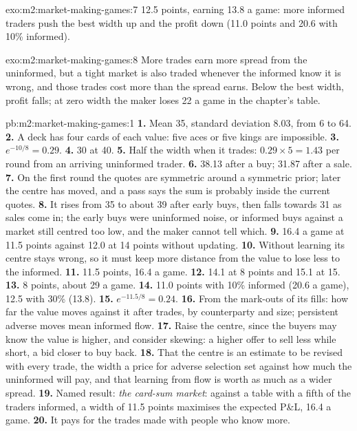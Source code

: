 \begin{solution}{exo:m2:market-making-games:7}
12.5 points, earning 13.8 a game: more informed traders push the best width up and the
profit down (11.0 points and 20.6 with 10\% informed).
\end{solution}

\begin{solution}{exo:m2:market-making-games:8}
More trades earn more spread from the uninformed, but a tight market is also traded
whenever the informed know it is wrong, and those trades cost more than the spread
earns. Below the best width, profit falls; at zero width the maker loses 22 a game in the
chapter's table.
\end{solution}

\begin{solution}{pb:m2:market-making-games:1}
\textbf{1.} Mean 35, standard deviation 8.03, from 6 to 64.
\textbf{2.} A deck has four cards of each value: five aces or five kings are impossible.
\textbf{3.} $e^{-10/8} = 0.29$.
\textbf{4.} 30 at 40.
\textbf{5.} Half the width when it trades: $0.29 \times 5 = 1.43$ per round from an
arriving uninformed trader.
\textbf{6.} 38.13 after a buy; 31.87 after a sale.
\textbf{7.} On the first round the quotes are symmetric around a symmetric prior; later
the centre has moved, and a pass says the sum is probably inside the current quotes.
\textbf{8.} It rises from 35 to about 39 after early buys, then falls towards 31 as sales
come in; the early buys were uninformed noise, or informed buys against a market still
centred too low, and the maker cannot tell which.
\textbf{9.} 16.4 a game at 11.5 points against 12.0 at 14 points without updating.
\textbf{10.} Without learning its centre stays wrong, so it must keep more distance from
the value to lose less to the informed.
\textbf{11.} 11.5 points, 16.4 a game.
\textbf{12.} 14.1 at 8 points and 15.1 at 15.
\textbf{13.} 8 points, about 29 a game.
\textbf{14.} 11.0 points with 10\% informed (20.6 a game), 12.5 with 30\% (13.8).
\textbf{15.} $e^{-11.5/8} = 0.24$.
\textbf{16.} From the mark-outs of its fills: how far the value moves against it after
trades, by counterparty and size; persistent adverse moves mean informed flow.
\textbf{17.} Raise the centre, since the buyers may know the value is higher, and consider
skewing: a higher offer to sell less while short, a bid closer to buy back.
\textbf{18.} That the centre is an estimate to be revised with every trade, the width a
price for adverse selection set against how much the uninformed will pay, and that
learning from flow is worth as much as a wider spread.
\textbf{19.} Named result: \emph{the card-sum market}: against a table with a fifth of the
traders informed, a width of 11.5 points maximises the expected P\&L, 16.4 a game.
\textbf{20.} It pays for the trades made with people who know more.
\end{solution}


